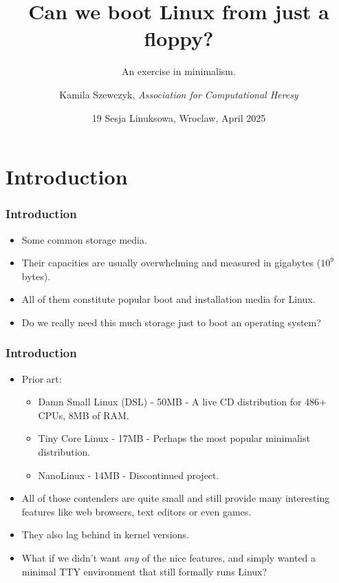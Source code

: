 \documentclass{beamer}
\title[Linux on a floppy]
{Can we boot Linux from just a floppy?}
\subtitle{An exercise in minimalism.}
\author[Kamila Szewczyk] %
{Kamila Szewczyk, \textit{Association for Computational Heresy}}
\date[19 Sesja Linuksowa] %
{19 Sesja Linuksowa, Wroclaw, April 2025}
\begin{document}
\frame{\titlepage}

\section{Introduction}
\begin{frame}[t]
\frametitle{Introduction}
\begin{itemize}
  \item Some common storage media.
\end{itemize}
\begin{figure}
  \centering
  \hspace{0.5cm}
  \hspace{0.5cm}
\end{figure}
\begin{itemize}
  \item Their capacities are usually overwhelming and measured in gigabytes ($10^9$ bytes).
  \item All of them constitute popular boot and installation media for Linux.
  \item Do we really need this much storage just to boot an operating system?
\end{itemize}
\end{frame}

\begin{frame}[t]
\frametitle{Introduction}
\begin{itemize}
  \item Prior art:
  \begin{itemize}
    \item Damn Small Linux (DSL) - 50MB - A live CD distribution for 486+ CPUs, 8MB of RAM.
    \item Tiny Core Linux - 17MB - Perhaps the most popular minimalist distribution.
    \item NanoLinux - 14MB - Discontinued project.
  \end{itemize}
  \item All of those contenders are quite small and still provide many interesting features like web browsers, text editors or even games.
  \item They also lag behind in kernel versions.
  \item What if we didn't want \textit{any} of the nice features, and simply wanted a minimal TTY environment that still formally runs Linux?
\end{itemize}
\end{frame}
\end{document}
